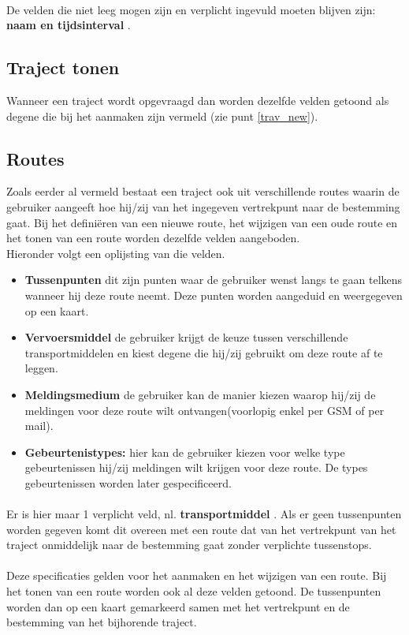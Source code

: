 \documentclass{scrbook}
\newcommand*{\veld}[1]{
	\item \textbf{#1} 
}
\newcommand*{\verplicht}[1]{
	\textbf{#1}
}
\begin{document}
\paragraph{}De velden die niet leeg mogen zijn en verplicht ingevuld moeten blijven zijn:\verplicht{naam en tijdsinterval}.

\subsection{Traject tonen}
Wanneer een traject wordt opgevraagd dan worden dezelfde velden getoond als degene die bij het aanmaken zijn vermeld (zie punt \ref{trav_new}). 


\subsection{Routes}\label{routes}
Zoals eerder al vermeld bestaat een traject ook uit verschillende routes waarin de gebruiker aangeeft hoe hij/zij van het ingegeven vertrekpunt naar de bestemming gaat. 
Bij het defini\"eren van een nieuwe route, het wijzigen van een oude route en het tonen van een route worden dezelfde velden aangeboden.\\Hieronder volgt een oplijsting van die velden.
\begin{itemize}
\veld{Tussenpunten} dit zijn punten waar de gebruiker wenst langs te gaan telkens wanneer hij deze route neemt. Deze punten worden aangeduid en weergegeven op een kaart.
\veld{Vervoersmiddel} de gebruiker krijgt de keuze tussen verschillende transportmiddelen en kiest degene die hij/zij gebruikt om deze route af te leggen.
\veld{Meldingsmedium} de gebruiker kan de manier kiezen waarop hij/zij de meldingen voor deze route wilt ontvangen(voorlopig enkel per GSM of per mail).
\veld{Gebeurtenistypes:} hier kan de gebruiker kiezen voor welke type gebeurtenissen hij/zij meldingen wilt krijgen voor deze route. De types gebeurtenissen worden later gespecificeerd.
\end{itemize}
\paragraph{}Er is hier maar 1 verplicht veld, nl. \verplicht{transportmiddel}. Als er geen tussenpunten worden gegeven komt dit overeen met een route dat van het vertrekpunt van het traject onmiddelijk naar de bestemming gaat zonder verplichte tussenstops.
\paragraph{}Deze specificaties gelden voor het aanmaken en het wijzigen van een route. Bij het tonen van een route worden ook al deze velden getoond. De tussenpunten worden dan op een kaart gemarkeerd samen met het vertrekpunt en de bestemming van het bijhorende traject.
\end{document}
